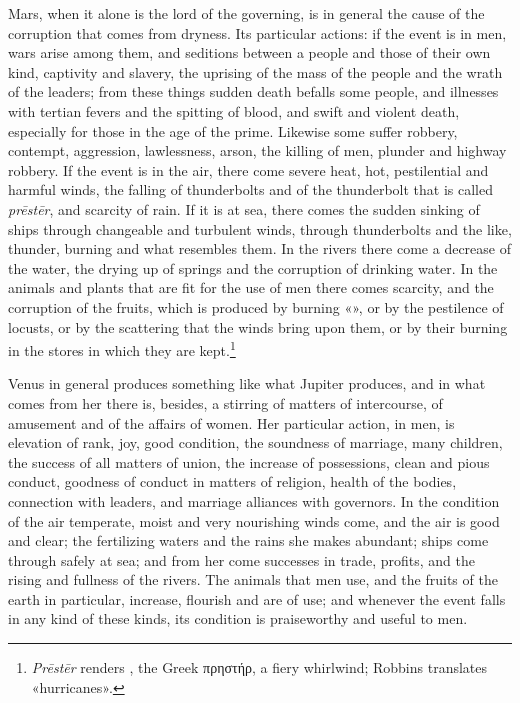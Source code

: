 \documentclass[11pt]{article}
\newcommand{\Fol}[1]{\marginpar{\footnotesize\color{gray}f.\,#1}}
\begin{document}
\par \Fol{29r}Mars, when it alone is the lord of the governing, is in general the cause of the corruption that comes from dryness. Its particular actions: if the event is in men, wars arise among them, and seditions between a people and those of their own kind, captivity and slavery, the uprising of the mass of the people and the wrath of the leaders; from these things sudden death befalls some people, and illnesses with tertian fevers and the spitting of blood, and swift and violent death, especially for those in the age of the prime. Likewise some suffer robbery, contempt, aggression, lawlessness, arson, the killing of men, plunder and highway robbery. If the event is in the air, there come severe heat, hot, pestilential and harmful winds, the falling of thunderbolts and of the thunderbolt that is called \emph{prēstēr}, and scarcity of rain. If it is at sea, there comes the sudden sinking of ships through changeable and turbulent winds, through thunderbolts and the like, thunder, burning and what resembles them. In the rivers there come a decrease of the water, the drying up of springs and the corruption of drinking water. In the animals and plants that are fit for the use of men there comes scarcity, and the corruption of the fruits, which is produced by burning «», or by the pestilence of locusts, or by the scattering that the winds bring upon them, or by their burning in the stores in which they are kept.\footnote{\emph{Prēstēr} renders , the Greek πρηστήρ, a fiery whirlwind; Robbins translates «hurricanes».}\par
\par Venus in general produces something like what Jupiter produces, and in what comes from her there is, besides, a stirring of matters of intercourse, of amusement and of the affairs of women. Her particular action, in men, is elevation of rank, joy, good condition, the soundness of marriage, many children, the success of all matters of union, the increase of possessions, clean and pious conduct, goodness of conduct in matters of religion, health of the bodies, connection with leaders, and marriage alliances with governors. In the condition of the air temperate, moist and very nourishing winds come, and the air is good and clear; the fertilizing waters and the rains she makes abundant; ships come through safely at sea; and from her come successes in trade, profits, and the rising and fullness of the rivers. The animals that men use, and the fruits of the earth in particular, increase, flourish and are of use; and whenever the event falls in any kind of these kinds, its condition is praiseworthy and useful to men.\par
\end{document}
